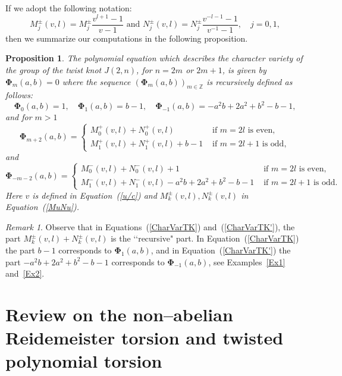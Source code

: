 \documentclass[a4paper]{amsart}
\theoremstyle{plain}
\newtheorem{proposition}[theorem]{Proposition}%
\theoremstyle{definition}
\theoremstyle{remark}
\newtheorem{remark}{Remark}%
\newcommand{\ZZ}{{\mathbb Z}}
\begin{document}
If we adopt the following notation:
\begin{equation}
\label{MuNu}
M^\pm_j(v, l) = M^\pm_j\frac{v^{l+1}-1}{v-1} \text{ and } N^\pm_j(v, l) = N^\pm_j\frac{v^{-l-1}-1}{v^{-1}-1}, \quad j = 0, 1,
\end{equation}
then we summarize our computations in the following proposition.
\begin{proposition}
The polynomial equation which describes the character variety of the group of the twist knot $J(2,n)$, {for} $n = 2m$ or $2m+1$, is given by  ${\mathbf\Phi}_{m}(a,b) = 0$ where the sequence ${\left( {\mathbf\Phi}_{m}(a,b) \right)}_{m \in \ZZ}$ is recursively defined as follows:
$${\mathbf\Phi}_0(a,b) = 1, \quad {\mathbf\Phi}_{1}(a,b) = b-1, \quad {\mathbf\Phi}_{-1}(a,b) = - a^2b + 2a^2 + b^2 - b - 1,$$ and for $m>1$
\begin{equation}\label{CharVarTK}
{\mathbf\Phi}_{m + 2}(a,b) = \begin{cases}
     M^+_0(v, l) + N^+_0(v, l) & \text{ if } m = 2l \text{ is even}, \\
     M^+_1(v, l) + N^+_1(v, l)+ b - 1 & \text{ if } m=2l+1 \text{ is odd},
\end{cases}
\end{equation}
and
\begin{equation}\label{CharVarTK'}
{\mathbf\Phi}_{-m - 2}(a,b) = \begin{cases}
     M^-_0(v, l) + N^-_0(v, l) + 1 & \text{ if } m = 2l \text{ is even}, \\
     M^-_1(v, l) + N^-_1(v, l) - a^2b + 2a^2 + b^2 - b - 1& \text{ if } m=2l+1 \text{ is odd}.
\end{cases}
\end{equation}
Here $v$ is defined in Equation~(\ref{u/c}) and $M^\pm_k(v, l), N^\pm_k(v, l)$ in Equation~(\ref{MuNu}).
\end{proposition}

\begin{remark}
Observe that in Equations~(\ref{CharVarTK}) and~(\ref{CharVarTK'}), the part $M^\pm_k(v, l) + N^\pm_k(v, l)$ is the \lq\lq recursive" part. In Equation~(\ref{CharVarTK}) the part $b-1$ corresponds to ${\mathbf\Phi}_{1}(a,b)$, and in Equation~(\ref{CharVarTK'}) the part $- a^2b + 2a^2 + b^2 - b - 1$ corresponds to ${\mathbf\Phi}_{-1}(a,b)$, see Examples~\ref{Ex1} and~\ref{Ex2}.
\end{remark}


\section{Review on the non--abelian Reidemeister torsion and twisted polynomial torsion}
\label{section:review_torsion}
\end{document}
